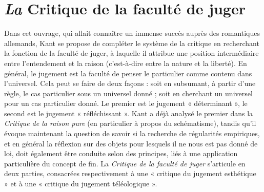 
\section{{\it La} Critique de la faculté de juger}

Dans cet ouvrage, qui allait connaître
un immense succès auprès des romantiques
allemands, Kant se propose de
compléter le système de la critique en
recherchant la fonction de la faculté de
juger, à laquelle il attribue une position
intermédiaire entre l’entendement et la
raison (c’est-à-dire entre la nature et la
liberté). En général, le jugement est la
faculté de penser le particulier comme
contenu dans l’universel. Cela peut se
faire de deux façons : soit en subsumant,
à partir d’une règle, le cas particulier sous
un universel donné ; soit en cherchant un
universel pour un cas particulier donné.
Le premier est le jugement « déterminant »,
le second est le jugement « réfléchissant ».
Kant a déjà analysé le premier
dans la {\it Critique de la raison pure} (en particulier
à propos du schématisme), tandis
qu’il évoque maintenant la question de
savoir si la recherche de régularités empiriques,
et en général la réflexion sur des
objets pour lesquels il ne nous est pas
donné de loi, doit également être
conduite selon des principes, liés à une
application particulière du concept de fin.
La {\it Critique de la faculté de juger} s’articule
%
en deux parties, consacrées respectivement
à une « critique du jugement esthétique »
et à une « critique du jugement
téléologique ».


